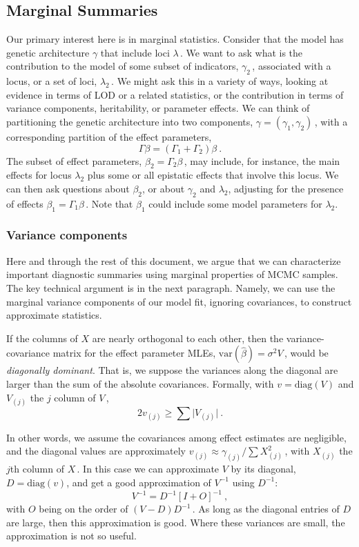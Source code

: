 \documentclass[12pt]{article}
\begin{document}
\subsection{Marginal Summaries}

Our primary interest here is in marginal statistics. Consider that the
model has genetic architecture $\gamma$ that include loci
$\lambda$\,. We want to ask what is the contribution to the model of
some subset of indicators, $\gamma_2$\,, associated with a locus, or a
set of loci, $\lambda_2$\,. We might ask this in a variety of ways,
looking at evidence in terms of LOD or a related statistics, or the
contribution in terms of variance components, heritability, or
parameter effects. We can think of partitioning the genetic
architecture into two components, $\gamma=(\gamma_1,\gamma_2)$\,,
with a corresponding partition of the effect parameters,
$$
\Gamma\beta=(\Gamma_1 + \Gamma_2)\beta~.
$$
The subset of effect parameters, $\beta_2=\Gamma_2\beta$\,, may
include, for instance, the main effects for locus $\lambda_2$ plus
some or all epistatic effects that involve this locus. We can then ask
questions about $\beta_2$, or about $\gamma_2$ and $\lambda_2$,
adjusting for the presence of effects $\beta_1=\Gamma_1\beta$\,. Note 
that $\beta_1$ could include some model parameters for $\lambda_2$.

\subsubsection{Variance components}

Here and through the rest of this document, we argue that we can
characterize important diagnostic summaries using marginal properties
of MCMC samples. The key technical argument is in the next
paragraph. Namely, we can use the marginal variance components of our
model fit, ignoring covariances, to construct approximate statistics.

If the columns of $X$ are nearly orthogonal to each other, then
the variance-covariance matrix for the effect parameter MLEs,
$\mbox{var}(\hat{\beta}) = \sigma^2V$\,,
would be {\em diagonally dominant}. That is, we suppose the variances
along the diagonal are larger than the sum of the absolute
covariances. Formally, with
$v=\mbox{diag}(V)$ and $V_{(j)}$ the $j$ column of $V$\,,
$$
2v_{(j)} \geq \sum \vert V_{(j)}\vert~.
$$

In other words, we assume the covariances among effect estimates are
negligible, and the diagonal values are approximately
$v_{(j)}\approx\gamma_{(j)}/\sum X_{(j)}^2$\,,
with $X_{(j)}$ the $j$th column of $X$\,.
In this case we can approximate $V$ by its diagonal, $D=\mbox{diag}(v)$,
and get a good approximation of $V^{-1}$ using $D^{-1}$:
$$
V^{-1}=D^{-1}[I+O]^{-1}~,
$$
with $O$ being on the order of $(V-D)D^{-1}$\,. As long as the
diagonal entries of $D$ are large, then this approximation
is good. Where these variances are small, the approximation is not so
useful. 
\end{document}
